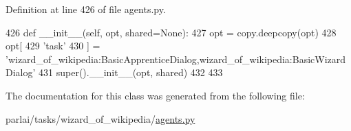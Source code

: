 Definition at line 426 of file agents.\+py.


\begin{DoxyCode}
426     \textcolor{keyword}{def }\_\_init\_\_(self, opt, shared=None):
427         opt = copy.deepcopy(opt)
428         opt[
429             \textcolor{stringliteral}{'task'}
430         ] = \textcolor{stringliteral}{'wizard\_of\_wikipedia:BasicApprenticeDialog,wizard\_of\_wikipedia:BasicWizardDialog'}
431         super().\_\_init\_\_(opt, shared)
432 
433 
\end{DoxyCode}


The documentation for this class was generated from the following file\+:\begin{DoxyCompactItemize}
\item 
parlai/tasks/wizard\+\_\+of\+\_\+wikipedia/\hyperlink{parlai_2tasks_2wizard__of__wikipedia_2agents_8py}{agents.\+py}\end{DoxyCompactItemize}
